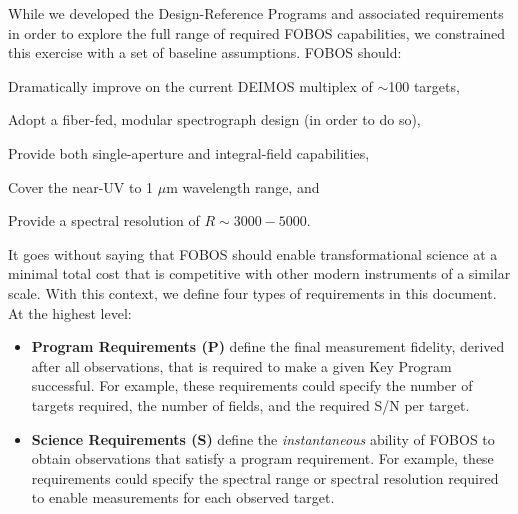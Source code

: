 \documentclass[11pt,a4paper,twoside,onecolumn,openany,final,oldfontcommands]{memoir}
\begin{document}

While we developed the Design-Reference Programs and associated requirements in order to explore the full range of required FOBOS capabilities, we constrained this exercise with a set of baseline assumptions.  FOBOS should:

\medskip
\begin{asparaenum}
\item Dramatically improve on the current DEIMOS multiplex of $\sim$100 targets,
\item Adopt a fiber-fed, modular spectrograph design (in order to do so),
\item Provide both single-aperture and integral-field capabilities,
\item Cover the near-UV to 1 $\mu$m wavelength range, and
\item Provide a spectral resolution of $R\sim 3000-5000$.
\end{asparaenum}
\medskip

\noindent It goes without saying that FOBOS should enable transformational science at a minimal total cost that is competitive with other modern instruments of a similar scale. With this context, we define four types of requirements in this document.  At the highest level:

\begin{itemize}
\item \textbf{Program Requirements (P)} define the final measurement fidelity, derived after all observations, that is required to make a given Key Program successful. For example, these requirements could specify the number of targets required, the number of fields, and the required S/N per target.

\item \textbf{Science Requirements (S)} define the \emph{instantaneous} ability of FOBOS to obtain observations that satisfy a program requirement.  For example, these requirements could specify the spectral range or spectral resolution required to enable measurements for each observed target.
\end{itemize}
\end{document}
